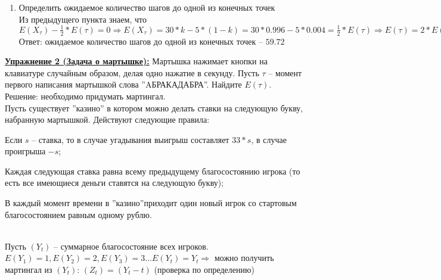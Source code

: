 \documentclass[a4paper]{article}
\begin{document}
\begin{enumerate}[label={\alph*)}]
\begin{table}[h]
\centering
\begin{tabular}{l|c|c}
${X}_{\tau}$ & $30$ & $-5$ \\ \hline
$p$ & $k$ & $1-k$  
\end{tabular}
\end{table}
\\ Где ''$k$'' -- искомая вероятность
\\ Таким образом, $E({R}_{\tau})=E({\frac{1}{3}}^{{X}_{\tau}})=k*{\frac{1}{3}^{30}}+(1-k)*{\frac{1}{3}^{-5}}=1 \Rightarrow k*{3^{-30}}+(1-k)*{3^{5}}=1 \Rightarrow k*({3^{5}}-{3^{-30}})=3^{5}-1 \Rightarrow k\approx0.996$
\\ Ответ:  $Pr(\text{улитка дойдет до точки ''30''})=0.996$
\item Определить ожидаемое количество шагов до одной из конечных точек
\\ Из предыдущего пункта знаем, что $E({X}_{\tau})-\frac{1}{2}*E(\tau)=0 \Rightarrow E({X}_{\tau})=30*k-5*(1-k)=30*0.996-5*0.004=\frac{1}{2}*E(\tau) \Rightarrow E(\tau)=2*E({X}_{\tau})=60*0.996-10*0.004=59.72$
\\ Ответ: ожидаемое количество шагов до одной из конечных точек -- $59.72$ 
\end{enumerate}
\par {\bf\underline{Упражнение 2 (Задача о мартышке):}} Мартышка нажимает кнопки на клавиатуре случайным образом, делая одно нажатие в секунду. Пусть $\tau$ -- момент первого написания мартышкой слова ''AБРАКАДАБРА''. Найдите $E(\tau)$.
\\Решение: необходимо придумать мартингал. \\ Пусть существует ''казино'' в котором можно делать ставки на следующую букву, набранную мартышкой. Действуют следующие правила: \begin{enumerate*}[font={\color{red!50!black}\bfseries}] \item Если $s$ -- ставка, то в случае угадывания выигрыш составляет $33*s$, в случае проигрыша $-s$; \ \item Каждая следующая ставка равна всему предыдущему благосостоянию игрока (то есть все имеющиеся деньги ставятся на следующую букву); \ \item В каждый момент времени в ''казино''приходит один новый игрок со стартовым благосостоянием равным одному рублю. \end{enumerate*}
\\ Пусть $({Y}_{t})$ -- суммарное благосостояние всех игроков. $E({Y}_{1})=1, E({Y}_{2})=2, E({Y}_{3})=3 \dots E({Y}_{t})={Y}_{t} \Rightarrow$ можно получить мартингал из  $({Y}_{t})$:  $({Z}_{t})=({Y}_{t}-t)$ (проверка по определению)
\end{document}
